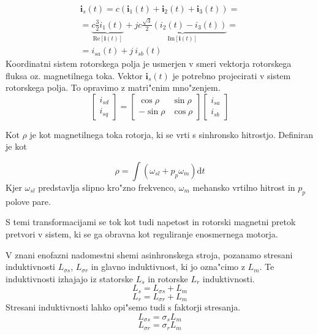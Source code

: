 \documentclass[journal,a4paper,twoside]{sty/IEEEtran}
\begin{document}
\begin{equation}
\begin{multlined}
{\textbf{i}_s}(t)= c (\textbf{i}_1(t)+\textbf{i}_2(t)+\textbf{i}_3(t))=\\
 = \underbrace{c \frac{3}{2}i_1(t)}_{\mathrm{Re}{[\textbf{i}(t)]}}+j \underbrace{c \frac{\sqrt{3}}{2}(i_2(t)-i_3(t))}_{\mathrm{Im}{[\textbf{i}(t)]}}= \\
  = i_{sa}(t)+j\:i_{sb}(t)\qquad \qquad \qquad\qquad\quad
  \end{multlined}
\end{equation}
Koordinatni sistem rotorskega polja je usmerjen v smeri vektorja rotorskega fluksa oz. magnetilnega toka. 
Vektor $\textbf{i}_s(t)$ je potrebno projecirati v sistem rotorskega polja. To opravimo z matri"cnim mno"zenjem.
\begin{equation}
\begin{bmatrix}
i_{sd}\\i_{sq}
\end{bmatrix}=
\begin{bmatrix}
\cos \rho& \sin \rho\\ -\sin\rho &\cos \rho
\end{bmatrix}
\begin{bmatrix}
i_{sa}\\i_{sb}
\end{bmatrix}
\end{equation}

Kot $\rho$ je kot magnetilnega toka rotorja, ki se vrti s sinhronsko hitrostjo. Definiran je kot

\begin{equation}
\rho=\int (\omega_{sl}+p_p \omega_m)\mathrm{d}t
\end{equation}
Kjer $\omega_{sl}$ predstavlja slipno kro"zno frekvenco, $\omega_m$ mehansko vrtilno hitrost  in $p_p$ polove pare.

S temi transformacijami se tok kot tudi napetost in rotorski magnetni pretok pretvori v sistem, ki se ga obravna kot reguliranje enosmernega motorja.


V  znani enofazni nadomestni shemi asinhronskega stroja, pozanamo stresani induktivnosti $L_{\sigma s}$, $L_{\sigma r}$ in glavno induktivnost, ki jo ozna"cimo z $L_m$. Te induktivnosti izhajajo iz statorske $L_s$ in rotorske $L_r$ induktivnosti.
\begin{equation}
L_s=L_{\sigma s}+L_m
\end{equation}
\begin{equation}
L_r=L_{\sigma r}+L_m
\end{equation}
Stresani induktivnosti lahko opi"semo tudi s faktorji stresanja.
\begin{equation}
L_{\sigma s}= \sigma_sL_m
\end{equation}
\begin{equation}
L_{\sigma r}= \sigma_rL_m
\end{equation}
\end{document}
